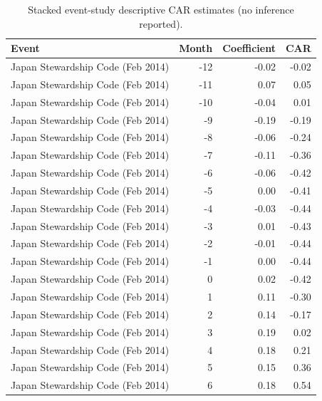 \begin{table}
\caption{Stacked event-study descriptive CAR estimates (no inference reported).}
\label{tab:event_study_coefs}
\begin{tabular}{lrrr}
\toprule
Event & Month & Coefficient & CAR \\
\midrule
Japan Stewardship Code (Feb 2014) & -12 & -0.02 & -0.02 \\
Japan Stewardship Code (Feb 2014) & -11 & 0.07 & 0.05 \\
Japan Stewardship Code (Feb 2014) & -10 & -0.04 & 0.01 \\
Japan Stewardship Code (Feb 2014) & -9 & -0.19 & -0.19 \\
Japan Stewardship Code (Feb 2014) & -8 & -0.06 & -0.24 \\
Japan Stewardship Code (Feb 2014) & -7 & -0.11 & -0.36 \\
Japan Stewardship Code (Feb 2014) & -6 & -0.06 & -0.42 \\
Japan Stewardship Code (Feb 2014) & -5 & 0.00 & -0.41 \\
Japan Stewardship Code (Feb 2014) & -4 & -0.03 & -0.44 \\
Japan Stewardship Code (Feb 2014) & -3 & 0.01 & -0.43 \\
Japan Stewardship Code (Feb 2014) & -2 & -0.01 & -0.44 \\
Japan Stewardship Code (Feb 2014) & -1 & 0.00 & -0.44 \\
Japan Stewardship Code (Feb 2014) & 0 & 0.02 & -0.42 \\
Japan Stewardship Code (Feb 2014) & 1 & 0.11 & -0.30 \\
Japan Stewardship Code (Feb 2014) & 2 & 0.14 & -0.17 \\
Japan Stewardship Code (Feb 2014) & 3 & 0.19 & 0.02 \\
Japan Stewardship Code (Feb 2014) & 4 & 0.18 & 0.21 \\
Japan Stewardship Code (Feb 2014) & 5 & 0.15 & 0.36 \\
Japan Stewardship Code (Feb 2014) & 6 & 0.18 & 0.54 \\

\end{tabular}
\end{table}
